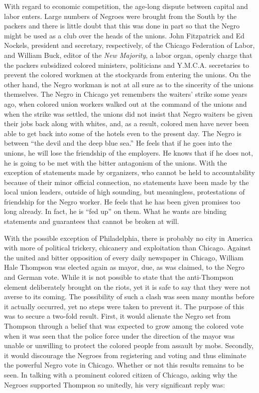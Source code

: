 \documentclass[11pt,article,oneside]{memoir}
\begin{document}
With regard to economic competition, the age-long dispute between
capital and labor enters. Large numbers of Negroes were brought from the
South by the packers and there is little doubt that this was done in
part so that the Negro might be used as a club over the heads of the
unions. John Fitzpatrick and Ed Nockels, president and secretary,
respectively, of the Chicago Federation of Labor, and William Buck,
editor of the \emph{New Majority}, a labor organ, openly charge that the
packers subsidized colored ministers, politicians and Y.M.C.A.
secretaries to prevent the colored workmen at the stockyards from
entering the unions. On the other hand, the Negro workman is not at all
sure as to the sincerity of the unions themselves. The Negro in Chicago
yet remembers the waiters' strike some years ago, when colored union
workers walked out at the command of the unions and when the strike was
settled, the unions did not insist that Negro waiters be given their
jobs back along with whites, and, as a result, colored men have never
been able to get back into some of the hotels even to the present day.
The Negro is between ``the devil and the deep blue sea.'' He feels that
if he goes into the unions, he will lose the friendship of the
employers. He knows that if he does not, he is going to be met with the
bitter antagonism of the unions. With the exception of statements made
by organizers, who cannot be held to accountability because of their
minor official connection, no statements have been made by the local
union leaders, outside of high sounding, but meaningless, protestations
of friendship for the Negro worker. He feels that he has been given
promises too long already. In fact, he is ``fed up'' on them. What he
wants are binding statements and guarantees that cannot be broken at
will.

With the possible exception of Philadelphia, there is probably no city
in America with more of political trickery, chicanery and exploitation
than Chicago. Against the united and bitter opposition of every daily
newspaper in Chicago, William Hale Thompson was elected again as mayor,
due, as was claimed, to the Negro and German vote. While it is not
possible to state that the anti-Thompson element deliberately brought on
the riots, yet it is safe to say that they were not averse to its
coming. The possibility of such a clash was seen many months before it
actually occurred, yet no steps were taken to prevent it. The purpose of
this was to secure a two-fold result. First, it would alienate the Negro
set from Thompson through a belief that was expected to grow among the
colored vote when it was seen that the police force under the direction
of the mayor was unable or unwilling to protect the colored people from
assault by mobs. Secondly, it would discourage the Negroes from
registering and voting and thus eliminate the powerful Negro vote in
Chicago. Whether or not this results remains to be seen. In talking with
a prominent colored citizen of Chicago, asking why the Negroes supported
Thompson so unitedly, his very significant reply was:
\end{document}
